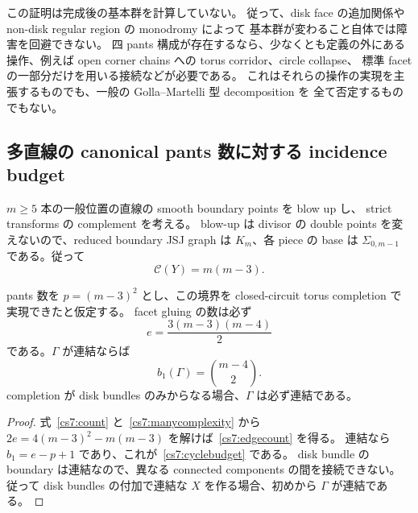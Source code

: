 \begin{remark}[必要になる変更の場所]
この証明は完成後の基本群を計算していない。
従って、disk face の追加関係や non-disk regular region の monodromy によって
基本群が変わること自体では障害を回避できない。
四 pants 構成が存在するなら、少なくとも定義の外にある操作、例えば
open corner chains への torus corridor、circle collapse、
標準 facet の一部分だけを用いる接続などが必要である。
これはそれらの操作の実現を主張するものでも、一般の Golla--Martelli 型 decomposition を
全て否定するものでもない。
\end{remark}

\subsection{多直線の canonical pants 数に対する incidence budget}

$m\geq5$ 本の一般位置の直線の smooth boundary points を blow up し、
strict transforms の complement を考える。
blow-up は divisor の double points を変えないので、reduced boundary JSJ graph は
$K_m$、各 piece の base は $\Sigma_{0,m-1}$ である。従って
\begin{equation}
 \mathcal C(Y)=m(m-3).
 \label{cs7:manycomplexity}
\end{equation}

\begin{proposition}
\label{cs7:budget}
pants 数を $p=(m-3)^2$ とし、この境界を
closed-circuit torus completion で実現できたと仮定する。
facet gluing の数は必ず
\begin{equation}
 e=\frac{3(m-3)(m-4)}2
 \label{cs7:edgecount}
\end{equation}
である。$\Gamma$ が連結ならば
\begin{equation}
 b_1(\Gamma)=\binom{m-4}{2}.
 \label{cs7:cyclebudget}
\end{equation}
completion が disk bundles のみからなる場合、$\Gamma$ は必ず連結である。
\end{proposition}

\begin{proof}
式~\eqref{cs7:count} と~\eqref{cs7:manycomplexity} から
$2e=4(m-3)^2-m(m-3)$ を解けば~\eqref{cs7:edgecount} を得る。
連結なら $b_1=e-p+1$ であり、これが~\eqref{cs7:cyclebudget} である。
disk bundle の boundary は連結なので、異なる connected components の間を接続できない。
従って disk bundles の付加で連結な $X$ を作る場合、初めから $\Gamma$ が連結である。
\end{proof}

